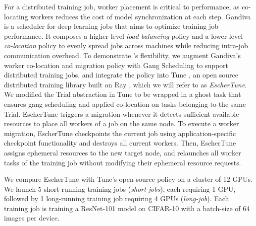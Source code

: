 \def\longjob{\emph{long-job}}
\def\shortjobs{\emph{short-jobs}}
For a distributed training job, worker placement is critical to performance, as co-locating workers reduces the cost of model synchronization at each step.
Gandiva \cite{gandiva} is a scheduler for deep learning jobs that aims to optimize training job performance. It composes a higher level \textit{load-balancing} policy and a lower-level \textit{co-location} policy to evenly spread jobs across machines while reducing intra-job communication overhead. 
To demonstrate \name{}'s flexibility, we augment Gandiva's \cite{gandiva} worker co-location and migration policy with Gang Scheduling to support distributed training jobs, and integrate the policy into Tune \cite{liaw2018tune}, an open source distributed training library built on Ray \cite{ray-osdi}, which we will refer to as \textit{EscherTune}.
We modified the Trial abstraction in Tune to be wrapped in a ghost task that ensures gang scheduling and applied co-location on tasks belonging to the same Trial.
EscherTune triggers a migration whenever it detects sufficient available resources to place all workers of a job on the same node.
To execute a worker migration, EscherTune checkpoints the current job using application-specific checkpoint functionality and destroys all current workers. Then, EscherTune assigns ephemeral resources to the new target node, and relaunches all worker tasks of the training job without modifying their ephemeral resource requests.
 
We compare EscherTune with Tune's open-source policy on a cluster of 12 GPUs. We launch 5 short-running training jobs (\shortjobs{}), each requiring 1 GPU, followed by 1 long-running training job requiring 4 GPUs (\longjob{}).
Each training job is training a ResNet-101 model on CIFAR-10 with a batch-size of 64 images per device.

